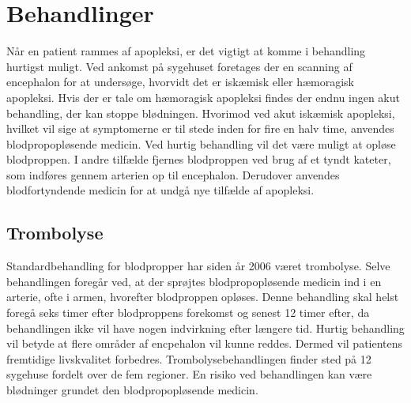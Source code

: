 \section{Behandlinger}
Når en patient rammes af apopleksi, er det vigtigt at komme i behandling hurtigst muligt. Ved ankomst på sygehuset foretages der en scanning af encephalon for at undersøge, hvorvidt det er iskæmisk eller hæmoragisk apopleksi. Hvis der er tale om hæmoragisk apopleksi findes der endnu ingen akut behandling, der kan stoppe blødningen.\cite{Soenderborg2013} Hvorimod ved akut iskæmisk apopleksi, hvilket vil sige at symptomerne er til stede inden for fire en halv time, anvendes blodpropopløsende medicin. Ved hurtig behandling vil det være muligt at opløse blodproppen. I andre tilfælde fjernes blodproppen ved brug af et tyndt kateter, som indføres gennem arterien op til encephalon. Derudover anvendes blodfortyndende medicin for at undgå nye tilfælde af apopleksi. \cite{Hjerteforeningen2014, Kruuse2014a} 

%
\subsection{Trombolyse}
Standardbehandling for blodpropper har siden år 2006 været trombolyse. Selve behandlingen foregår ved, at der sprøjtes blodpropopløsende medicin ind i en arterie, ofte i armen, hvorefter blodproppen opløses. Denne behandling skal helst foregå seks timer efter blodproppens forekomst og senest 12 timer efter, da behandlingen ikke vil have nogen indvirkning efter længere tid. Hurtig behandling vil betyde at flere områder af encpehalon vil kunne reddes. Dermed vil patientens fremtidige livskvalitet forbedres. Trombolysebehandlingen finder sted på 12 sygehuse fordelt over de fem regioner. En risiko ved behandlingen kan være blødninger grundet den blodpropopløsende medicin. \cite{Hjernesagen2015b}

